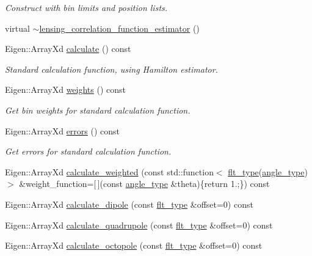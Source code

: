 \begin{DoxyCompactItemize}
\begin{DoxyCompactList}\small\item\em Construct with bin limits and position lists. \end{DoxyCompactList}\item 
virtual \hyperlink{classIceBRG_1_1lensing__correlation__function__estimator_aaf27a7674e42ae2374c0811a9ee60f6b}{$\sim$lensing\+\_\+correlation\+\_\+function\+\_\+estimator} ()
\item 
Eigen\+::\+Array\+Xd \hyperlink{classIceBRG_1_1lensing__correlation__function__estimator_a22799f94d3c0775d3cf3a090625d547c}{calculate} () const 
\begin{DoxyCompactList}\small\item\em Standard calculation function, using Hamilton estimator. \end{DoxyCompactList}\item 
Eigen\+::\+Array\+Xd \hyperlink{classIceBRG_1_1lensing__correlation__function__estimator_a799236f67bbcd55458facf1e537516f8}{weights} () const 
\begin{DoxyCompactList}\small\item\em Get bin weights for standard calculation function. \end{DoxyCompactList}\item 
Eigen\+::\+Array\+Xd \hyperlink{classIceBRG_1_1lensing__correlation__function__estimator_aaebc4933a7fc0a2b6bcbaac93100c2d7}{errors} () const 
\begin{DoxyCompactList}\small\item\em Get errors for standard calculation function. \end{DoxyCompactList}\item 
Eigen\+::\+Array\+Xd \hyperlink{classIceBRG_1_1lensing__correlation__function__estimator_a22ba98be7ea785587d05b2381951b569}{calculate\+\_\+weighted} (const std\+::function$<$ \hyperlink{lib_2IceBRG__main_2common_8h_ad0f130a56eeb944d9ef2692ee881ecc4}{flt\+\_\+type}(\hyperlink{namespaceIceBRG_a688eeb0811a2474b20b667ed2e9625a1}{angle\+\_\+type})$>$ \&weight\+\_\+function=\mbox{[}$\,$\mbox{]}(const \hyperlink{namespaceIceBRG_a688eeb0811a2474b20b667ed2e9625a1}{angle\+\_\+type} \&theta)\{return 1.;\}) const 
\item 
Eigen\+::\+Array\+Xd \hyperlink{classIceBRG_1_1lensing__correlation__function__estimator_a3affd4412dfe205d24d2a9632d26feca}{calculate\+\_\+dipole} (const \hyperlink{lib_2IceBRG__main_2common_8h_ad0f130a56eeb944d9ef2692ee881ecc4}{flt\+\_\+type} \&offset=0) const 
\item 
Eigen\+::\+Array\+Xd \hyperlink{classIceBRG_1_1lensing__correlation__function__estimator_ac759a8afd50dc41d7e492344593cf86d}{calculate\+\_\+quadrupole} (const \hyperlink{lib_2IceBRG__main_2common_8h_ad0f130a56eeb944d9ef2692ee881ecc4}{flt\+\_\+type} \&offset=0) const 
\item 
Eigen\+::\+Array\+Xd \hyperlink{classIceBRG_1_1lensing__correlation__function__estimator_a98cdfed231b5a03fc27c5f6aef27ea47}{calculate\+\_\+octopole} (const \hyperlink{lib_2IceBRG__main_2common_8h_ad0f130a56eeb944d9ef2692ee881ecc4}{flt\+\_\+type} \&offset=0) const 
\end{DoxyCompactItemize}


